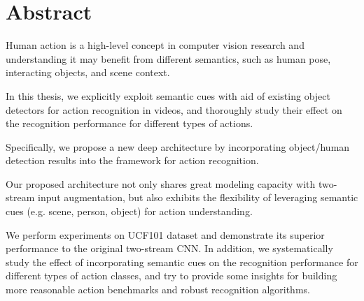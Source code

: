 \chapter*{Abstract}
Human action is a high-level concept in computer vision research and understanding it may benefit from different semantics, such as human pose, interacting objects, and scene context.

In this thesis, we explicitly exploit semantic cues with aid of existing object detectors for action recognition in videos, and thoroughly study their effect on the recognition performance for different types of actions. 

Specifically, we propose a new deep architecture by incorporating object/human detection results into the framework for action recognition.

Our proposed architecture not only shares great modeling capacity with two-stream input augmentation, but also exhibits the flexibility of leveraging semantic cues (e.g. scene, person, object) for action understanding.

We perform experiments on UCF101 dataset and demonstrate its superior performance to the original two-stream CNN.
In addition, we systematically study the effect of incorporating semantic cues on the recognition performance for different types of action classes, and try to provide some insights for building more reasonable action benchmarks and robust recognition algorithms.
